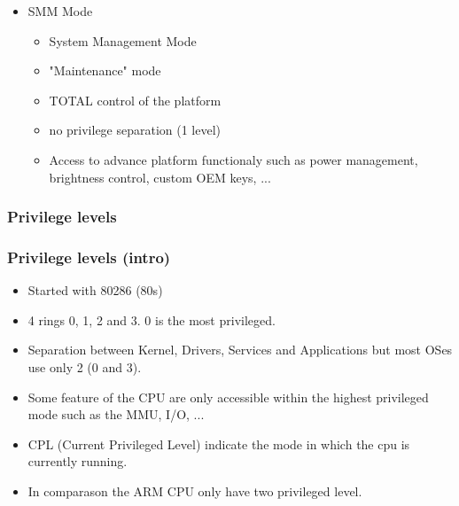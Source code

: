 \begin{frame}
\begin{itemize}
        \item SMM Mode
                \begin{itemize}
                \item System Management Mode
                \item "Maintenance" mode
                \item TOTAL control of the platform
                \item no privilege separation (1 level)
                \item Access to advance platform functionaly such as
                      power management, brightness control, custom OEM
                      keys, ...
                \end{itemize}
        \end{itemize}
\end{frame}

\subsubsection{Privilege levels}
        \begin{frame}
        \frametitle{Privilege levels (intro)}
        \begin{itemize}
                \item Started with 80286 (80s)
                \item 4 rings 0, 1, 2 and 3. 0 is the most privileged.
                \item Separation between Kernel, Drivers, Services and
                      Applications but most OSes use only 2 (0 and 3).
                \item Some feature of the CPU are only accessible
                within the highest privileged mode such as the MMU, I/O,
                ...
                \item CPL (Current Privileged Level) indicate the mode
                      in which the cpu is currently running.
                \item In comparason the ARM CPU only have two privileged
                      level.
        \end{itemize}
        \end{frame}


